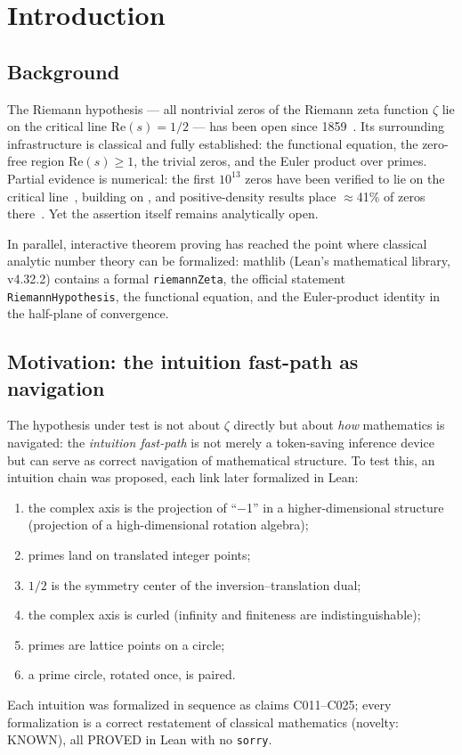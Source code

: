 \documentclass[11pt]{article}
\theoremstyle{remark}
\begin{document}
\section{Introduction}
\label{sec:intro}

\subsection{Background}

The Riemann hypothesis --- all nontrivial zeros of the Riemann zeta function
$\zeta$ lie on the critical line $\mathrm{Re}(s)=1/2$ --- has been open since
1859~\cite{riemann1859}. Its surrounding infrastructure is classical and fully
established: the functional equation, the zero-free region
$\mathrm{Re}(s)\geq 1$, the trivial zeros, and the Euler product over primes.
Partial evidence is numerical: the first $10^{13}$ zeros have been verified to
lie on the critical line~\cite{gourdon2004}, building on
\cite{vandulune1986}, and positive-density results place $\approx$41\% of
zeros there~\cite{levinson1974,conrey1989}. Yet the assertion itself remains
analytically open.

In parallel, interactive theorem proving has reached the point where classical
analytic number theory can be formalized: mathlib (Lean's mathematical
library, v4.32.2) contains a formal \texttt{riemannZeta}, the official
statement \texttt{RiemannHypothesis}, the functional equation, and the
Euler-product identity in the half-plane of convergence.

\subsection{Motivation: the intuition fast-path as navigation}

The hypothesis under test is not about $\zeta$ directly but about \emph{how}
mathematics is navigated: the \emph{intuition fast-path} is not merely a
token-saving inference device but can serve as correct navigation of
mathematical structure. To test this, an intuition chain was proposed, each
link later formalized in Lean:
\begin{enumerate}
  \item the complex axis is the projection of ``$-$1'' in a
        higher-dimensional structure (projection of a high-dimensional
        rotation algebra);
  \item primes land on translated integer points;
  \item $1/2$ is the symmetry center of the inversion--translation dual;
  \item the complex axis is curled (infinity and finiteness are
        indistinguishable);
  \item primes are lattice points on a circle;
  \item a prime circle, rotated once, is paired.
\end{enumerate}
Each intuition was formalized in sequence as claims C011--C025; every
formalization is a correct restatement of classical mathematics (novelty:
KNOWN), all PROVED in Lean with no \texttt{sorry}.
\end{document}

